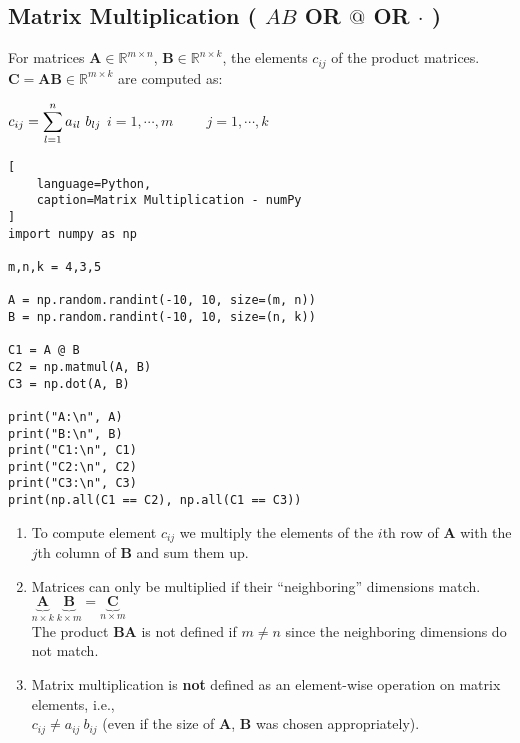 \subsection{Matrix Multiplication ( $AB$ OR $@$ OR $\cdot$ ) \cite{mfml/book/mml/Deisenroth-Faisal-Ong}}

For matrices $\bm{A} \in \mathbb{R}^{m\times n}$, $\bm{B} \in \mathbb{R}^{n\times k}$, the elements $c_{ij}$ of the product matrices. $\bm{C} = \bm{AB} \in \mathbb{R}^{m\times k}$ are computed as:

\vspace{0.5cm}
\hfill
$
    c_{ij} = \dsum_{l=1}^n a_{il}\ b_{lj}
$
\hfill
$
    i = 1,\cdots,m
    \hspace{1cm}
    j = 1,\cdots,k
$
\hfill \cite{mfml/book/mml/Deisenroth-Faisal-Ong}





\begin{lstlisting}[
    language=Python,
    caption=Matrix Multiplication - numPy
]
import numpy as np

m,n,k = 4,3,5

A = np.random.randint(-10, 10, size=(m, n))
B = np.random.randint(-10, 10, size=(n, k))

C1 = A @ B
C2 = np.matmul(A, B)
C3 = np.dot(A, B)

print("A:\n", A)
print("B:\n", B)
print("C1:\n", C1)
print("C2:\n", C2)
print("C3:\n", C3)
print(np.all(C1 == C2), np.all(C1 == C3))
\end{lstlisting}




\vspace{0.5cm}

\begin{enumerate}
    \item To compute element $c_{ij}$ we multiply the elements of the $i$th row of $\bm{A}$ with the $j$th column of $\bm{B}$ and sum them up.
    \hfill \cite{mfml/book/mml/Deisenroth-Faisal-Ong}

    \item Matrices can only be multiplied if their “neighboring” dimensions match.
    \hfill \cite{mfml/book/mml/Deisenroth-Faisal-Ong}
    \\
    \hfill
    $
        \underset{n\times k}{\underbrace{\bm{A}}}\
        \underset{k\times m}{\underbrace{\bm{B}}}
        =
        \underset{n\times m}{\underbrace{\bm{C}}}
    $
    \hfill \cite{mfml/book/mml/Deisenroth-Faisal-Ong}
    \\
    The product $\bm{BA}$ is not defined if $m \neq n$ since the neighboring dimensions do not match.

    \item Matrix multiplication is \textbf{not} defined as an element-wise operation on matrix elements, i.e., 
    \\
    $c_{ij} \neq a_{ij}\ b_{ij}$ (even if the size of $\bm{A}$, $\bm{B}$ was chosen appropriately).
    \hfill \cite{mfml/book/mml/Deisenroth-Faisal-Ong}
\end{enumerate}


